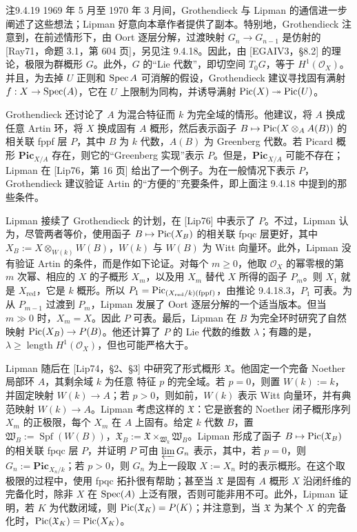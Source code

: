 \begin{origstatement}{注}{9.4.19}
1969 年 5 月至 1970 年 3 月间，Grothendieck 与 Lipman 的通信进一步阐述了这些想法；Lipman 好意向本章作者提供了副本。特别地，Grothendieck 注意到，在前述情形下，由 Oort 逐层分解，过渡映射 $G_n\to G_{n-1}$ 是仿射的 [Ray71，命题 3.1，第 604 页]，另见注 9.4.18。因此，由 [EGAIV3，§8.2] 的理论，极限为群概形 $G$。此外，$G$ 的“Lie 代数”，即切空间 $T_0G$，等于 $H^1(\mathcal O_X)$。并且，为去掉 $U$ 正则和 $\operatorname{Spec} A$ 可消解的假设，Grothendieck 建议寻找固有满射 $f:X\to\operatorname{Spec}(A)$，它在 $U$ 上限制为同构，并诱导满射 $\operatorname{Pic}(X)\twoheadrightarrow\operatorname{Pic}(U)$。

Grothendieck 还讨论了 $A$ 为混合特征而 $k$ 为完全域的情形。他建议，将 $A$ 换成任意 Artin 环，将 $X$ 换成固有 $A$ 概形，然后表示函子 $B\mapsto\operatorname{Pic}(X\otimes_A A(B))$ 的相关联 fppf 层 $P$，其中 $B$ 为 $k$ 代数，$A(B)$ 为 Greenberg 代数。若 Picard 概形 $\mathbf{Pic}_{X/A}$ 存在，则它的“Greenberg 实现”表示 $P$。但是，$\mathbf{Pic}_{X/A}$ 可能不存在；Lipman 在 [Lip76，第 16 页] 给出了一个例子。为在一般情况下表示 $P$，Grothendieck 建议验证 Artin 的“方便的”充要条件，即上面注 9.4.18 中提到的那些条件。

Lipman 接续了 Grothendieck 的计划，在 [Lip76] 中表示了 $P$。不过，Lipman 认为，尽管两者等价，使用函子 $B\mapsto\operatorname{Pic}(X_B)$ 的相关联 fpqc 层更好，其中 $X_B:=X\otimes_{W(k)}W(B)$，$W(k)$ 与 $W(B)$ 为 Witt 向量环。此外，Lipman 没有验证 Artin 的条件，而是作如下论证。对每个 $m\geq0$，他取 $\mathcal O_X$ 的幂零根的第 $m$ 次幂、相应的 $X$ 的子概形 $X_m$，以及用 $X_m$ 替代 $X$ 所得的函子 $P_m$。则 $X_1$ 就是 $X_{\mathrm{red}}$，它是 $k$ 概形。所以 $P_1=\operatorname{Pic}_{(X_{\mathrm{red}}/k)(\mathrm{fppf})}$，由推论 9.4.18.3，$P_1$ 可表。为从 $P_{m-1}$ 过渡到 $P_m$，Lipman 发展了 Oort 逐层分解的一个适当版本。但当 $m\gg0$ 时，$X_m=X$。因此 $P$ 可表。最后，Lipman 在 $B$ 为完全环时研究了自然映射 $\operatorname{Pic}(X_B)\to P(B)$。他还计算了 $P$ 的 Lie 代数的维数 $\lambda$；有趣的是，$\lambda\geq\operatorname{length}H^1(\mathcal O_X)$，但也可能严格大于。

Lipman 随后在 [Lip74，§2、§3] 中研究了形式概形 $\mathfrak X$。他固定一个完备 Noether 局部环 $A$，其剩余域 $k$ 为任意
特征 $p$ 的完全域。若 $p=0$，则置 $W(k):=k$，并固定映射 $W(k)\to A$；若 $p>0$，则如前，$W(k)$ 表示 Witt 向量环，并有典范映射 $W(k)\to A$。Lipman 考虑这样的 $\mathfrak X$：它是嵌套的 Noether 闭子概形序列 $X_m$ 的正极限，每个 $X_m$ 在 $A$ 上固有。给定 $k$ 代数 $B$，置 $\mathfrak W_B:=\operatorname{Spf}(W(B))$，$\mathfrak X_B:=\mathfrak X\times_{\mathfrak W_k}\mathfrak W_B$。Lipman 形成了函子 $B\mapsto\operatorname{Pic}(\mathfrak X_B)$ 的相关联 fpqc 层 $P$，并证明 $P$ 可由 $\varprojlim G_n$ 表示，其中，若 $p=0$，则 $G_n:=\mathbf{Pic}_{X_n/k}$；若 $p>0$，则 $G_n$ 为上一段取 $X:=X_n$ 时的表示概形。在这个取极限的过程中，使用 fpqc 拓扑很有帮助；甚至当 $\mathfrak X$ 是固有 $A$ 概形 $X$ 沿闭纤维的完备化时，除非 $X$ 在 $\operatorname{Spec}(A)$ 上泛有限，否则可能非用不可。此外，Lipman 证明，若 $K$ 为代数闭域，则 $\operatorname{Pic}(\mathfrak X_K)=P(K)$；并注意到，当 $\mathfrak X$ 为某个 $X$ 的完备化时，$\operatorname{Pic}(\mathfrak X_K)=\operatorname{Pic}(X_K)$。


\end{origstatement}
